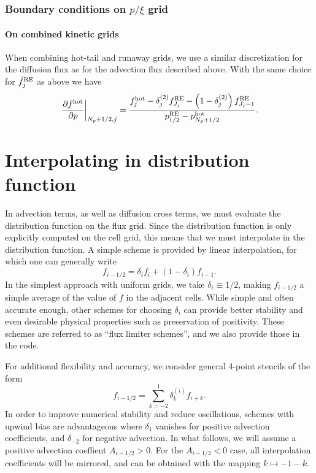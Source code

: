 \documentclass{notes}
\begin{document}
	\subsubsection{Boundary conditions on $p/\xi$ grid}

    \paragraph{On combined kinetic grids}
    When combining hot-tail and runaway grids, we use a similar discretization
    for the diffusion flux as for the advection flux described above. With the
    same choice for $\hat{f}^{\rm RE}_j$ as above we have
    \begin{equation}
        \left.\frac{\partial f^{\rm hot}}{\partial p}\right|_{N_p+1/2,j} =
            \frac{f^{\rm hot}_j - \delta^{(2)}_j f_{J_j}^{\rm RE} -
            \left( 1 - \delta^{(2)}_j \right) f^{\rm RE}_{J_j-1}}
            {p^{\rm RE}_{1/2} - p^{\rm hot}_{N_p+1/2}}.
    \end{equation}

    \section{Interpolating in distribution function}\label{sec:interp}
    In advection terms, as well as diffusion cross terms, we must evaluate the
    distribution function on the flux grid. Since the distribution function is
    only explicitly computed on the cell grid, this means that we must
    interpolate in the distribution function. A simple scheme is provided by 
    linear interpolation, for which one can generally write
    \begin{equation}
        f_{i-1/2} = \delta_{i} f_i + \left( 1 - \delta_i \right) f_{i-1}.
    \end{equation}
    In the simplest approach with uniform grids, we take $\delta_i\equiv 1/2$, making $f_{i-1/2}$
    a simple average of the value of $f$ in the adjacent cells. While simple and
    often accurate enough, other schemes for choosing $\delta_i$ can provide
    better stability and even desirable physical properties such as preservation
    of positivity. These schemes are referred to as ``flux limiter schemes'',
    and we also provide those in the code.
    
    For additional flexibility and accuracy, we consider general 4-point stencils of the form
    \begin{equation}
    	f_{i-1/2} = \sum_{k=-2}^1 \delta^{(i)}_k f_{i+k}.
    \end{equation}
    In order to improve numerical stability and reduce oscillations, schemes with 
    upwind bias are advantageous where $\delta_{1}$ vanishes for positive 
    advection coefficients, and $\delta_{-2}$ for negative advection. In what follows,
    we will assume a positive advection coeffient $A_{i-1/2}>0$. For the $A_{i-1/2}<0$ 
    case, all interpolation coefficients will be mirrored, and can be obtained with the 
    mapping $k \mapsto -1 - k$.
    
\end{document}
